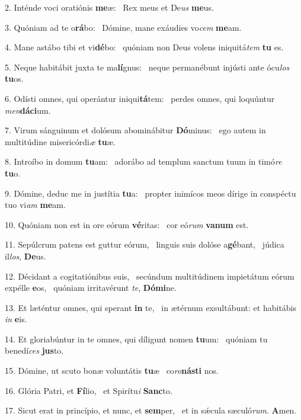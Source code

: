 2. Inténde voci oratiónis \textbf{me}æ: \ast\  Rex meus et De\textit{us} \textbf{me}us.\

3. Quóniam ad te o\textbf{rá}bo: \ast\  Dómine, mane exáudies vo\textit{cem} \textbf{me}am.\

4. Mane astábo tibi et vi\textbf{dé}bo: \ast\  quóniam non Deus volens iniquitá\textit{tem} \textbf{tu} es.\

5. Neque habitábit juxta te ma\textbf{lí}gnus: \ast\  neque permanébunt injústi ante ócu\textit{los} \textbf{tu}os.\

6. Odísti omnes, qui operántur iniqui\textbf{tá}tem: \ast\  perdes omnes, qui loquúntur \textit{men}\textbf{dá}\textbf{ci}um.\

7. Virum sánguinum et dolósum abominábitur \textbf{Dó}minus: \ast\  ego autem in multitúdine misericórdi\textit{æ} \textbf{tu}æ.\

8. Introíbo in domum \textbf{tu}am: \ast\  adorábo ad templum sanctum tuum in timó\textit{re} \textbf{tu}o.\

9. Dómine, deduc me in justítia \textbf{tu}a: \ast\  propter inimícos meos dírige in conspéctu tuo vi\textit{am} \textbf{me}am.\

10. Quóniam non est in ore eórum \textbf{vé}ritas: \ast\  cor eó\textit{rum} \textbf{va}\textbf{num} est.\

11. Sepúlcrum patens est guttur eórum, \dag\  linguis suis dolóse a\textbf{gé}bant, \ast\  júdica il\textit{los}, \textbf{De}us.\

12. Décidant a cogitatiónibus suis, \dag\  secúndum multitúdinem impietátum eórum expélle \textbf{e}os, \ast\  quóniam irritavérunt \textit{te}, \textbf{Dó}\textbf{mi}ne.\

13. Et læténtur omnes, qui sperant \textbf{in} te, \ast\  in ætérnum exsultábunt: et habitábis \textit{in} \textbf{e}is.\

14. Et gloriabúntur in te omnes, qui díligunt nomen \textbf{tu}um: \ast\  quóniam tu benedí\textit{ces} \textbf{jus}to.\

15. Dómine, ut scuto bonæ voluntátis \textbf{tu}æ \ast\  co\textit{ro}\textbf{nás}\textbf{ti} nos.\

16. Glória Patri, et \textbf{Fí}lio, \ast\  et Spirítu\textit{i} \textbf{Sanc}to.\

17. Sicut erat in princípio, et nunc, et \textbf{sem}per, \ast\  et in sǽcula sæculó\textit{rum}. \textbf{A}men.\

